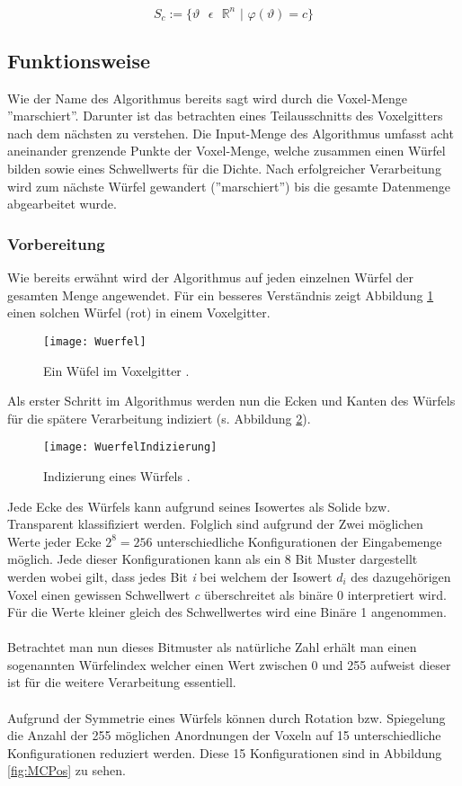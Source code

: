 \begin{equation}
\label{mat:isoDef}
S_{c} := \{ \vartheta \text{ } \epsilon \text{ } \mathbb{R}^{n} \text{ | } \varphi(\vartheta) = c\}
\end{equation} 
\subsection{Funktionsweise}

Wie der Name des Algorithmus bereits sagt wird durch die Voxel-Menge ''marschiert''. Darunter ist das betrachten eines Teilausschnitts des Voxelgitters nach dem nächsten zu verstehen. Die Input-Menge des Algorithmus umfasst acht aneinander grenzende Punkte der Voxel-Menge, welche zusammen einen Würfel bilden sowie eines Schwellwerts für die Dichte. Nach erfolgreicher Verarbeitung wird zum nächste Würfel gewandert (''marschiert'') bis die gesamte Datenmenge abgearbeitet wurde.
\subsubsection{Vorbereitung}
Wie bereits erwähnt wird der Algorithmus auf jeden einzelnen Würfel der gesamten Menge angewendet. Für ein besseres Verständnis zeigt Abbildung \ref{fig:Wuerfel} einen solchen Würfel (rot) in einem Voxelgitter.
\begin{figure}[H]
	\centering
	\texttt{[image: Wuerfel]}
	\caption{Ein Wüfel im Voxelgitter \citep{SeibtBak}.}
	\label{fig:Wuerfel}
\end{figure}
\noindent Als erster Schritt im Algorithmus werden nun die Ecken und Kanten des Würfels für die spätere Verarbeitung indiziert (s. Abbildung \ref{fig:WuerfelIndizierung}).
\begin{figure}[H]
	\centering
	\texttt{[image: WuerfelIndizierung]}
	\caption{Indizierung eines Würfels \citep{SeibtBak}.}
	\label{fig:WuerfelIndizierung}
\end{figure}

\noindent Jede Ecke des Würfels kann aufgrund seines Isowertes als Solide bzw. Transparent klassifiziert werden. Folglich sind aufgrund der Zwei möglichen Werte jeder Ecke $2^{8} = 256$ unterschiedliche Konfigurationen der Eingabemenge möglich. Jede dieser Konfigurationen kann als ein 8 Bit Muster dargestellt werden wobei gilt, dass jedes Bit \textit{i} bei welchem der Isowert \textit{$d_{i}$} des dazugehörigen Voxel einen gewissen Schwellwert \textit{c} überschreitet als binäre 0 interpretiert wird. Für die Werte kleiner gleich des Schwellwertes wird eine Binäre 1 angenommen.\\
\\ 
Betrachtet man nun dieses Bitmuster als natürliche Zahl erhält man einen sogenannten Würfelindex welcher einen Wert zwischen 0  und 255 aufweist dieser ist für die weitere Verarbeitung essentiell.\\
\\
Aufgrund der Symmetrie eines Würfels können durch Rotation bzw. Spiegelung die Anzahl der 255 möglichen Anordnungen der Voxeln auf 15 unterschiedliche Konfigurationen reduziert werden. Diese 15 Konfigurationen sind in Abbildung \ref{fig:MCPos} zu sehen.

